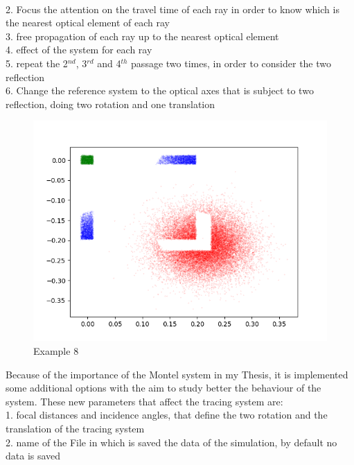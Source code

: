 	\\ \hspace{20mm} 2. Focus the attention on the travel time of each ray in order to know which is the nearest optical element of each ray
	\\ \hspace{20mm} 3. free propagation of each ray up to the nearest optical element
	\\ \hspace{20mm} 4. effect of the system for each ray
	\\ \hspace{20mm} 5. repeat the 2$^{nd} $, 3$^{rd} $ and 4$^{th} $ passage two times, in order to consider the two reflection
	\\ \hspace{20mm} 6. Change the reference system to the optical axes that is subject to two reflection, doing two rotation and one translation
\begin{figure}[H]
%
\centering
%
\includegraphics[width=1.\textwidth]{Immagini/Chapter3/BigSourceMontel}
%
\caption{Example 8}
%
\label{fig: BigSourceMontel}
%
\end{figure}
\noindent Because of the importance of the Montel system in my Thesis, it is implemented some additional options with the aim to study better the behaviour of the system. These new parameters that affect the tracing system are: 
	\\ \hspace{20mm} 1. focal distances and incidence angles, that define the two rotation and the translation of the tracing system
	\\ \hspace{20mm} 2. name of the File in which is saved the data of the simulation, by default no data is saved
